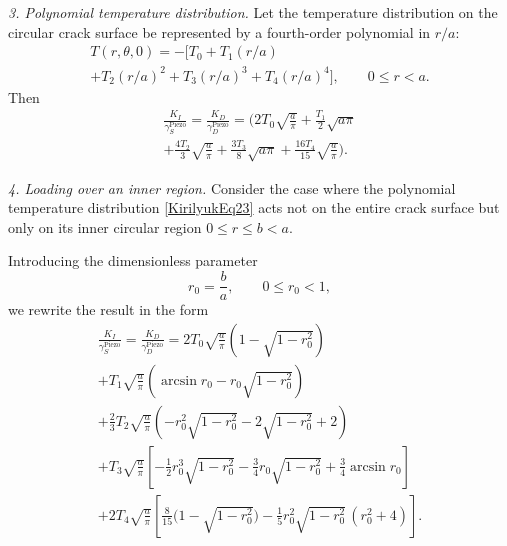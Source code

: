 \medskip
\emph{3. Polynomial temperature distribution.} Let the temperature distribution on the circular crack surface be represented by a fourth-order polynomial in $r/a$:
\begin{multline}
	T(r,\theta,0)
	=
	-\big[
	T_0 + T_1(r/a) 
	\\
	+ T_2(r/a)^2 + T_3(r/a)^3 + T_4(r/a)^4
	\big],
	\qquad 0 \le r < a .
	\label{KirilyukEq23}
\end{multline}
Then
\begin{multline}
	\frac{K_I}{\gamma_S^{\text{Piezo}}}
	=
	\frac{K_D}{\gamma_D^{\text{Piezo}}}
	=
	\bigg(
	2T_0\sqrt{\frac{a}{\pi}}
	+\frac{T_1}{2}\sqrt{a\pi}
	\\
	+\frac{4T_2}{3}\sqrt{\frac{a}{\pi}}
	+\frac{3T_3}{8}\sqrt{a\pi}
	+\frac{16T_4}{15}\sqrt{\frac{a}{\pi}}
	\bigg).
	\label{KirilyukEq24}
\end{multline}

\medskip
\emph{4. Loading over an inner region.} Consider the case where the polynomial temperature distribution
\eqref{KirilyukEq23} acts not on the entire crack surface but only on its inner circular region
$0 \le r \le b < a$.

Introducing the dimensionless parameter
\[
r_0=\frac{b}{a}, \qquad 0\le r_0  <1,
\]
we rewrite the result in the form
\begin{multline}
	\frac{K_I}{\gamma_S^{\text{Piezo}}}
	=
	\frac{K_D}{\gamma_D^{\text{Piezo}}}
	=
	2T_0\sqrt{\frac{a}{\pi}}
	\left(1-\sqrt{1- r_0^2}\right)
	\\
	+T_1\sqrt{\frac{a}{\pi}}
	\left(
	\arcsin r_0
	- r_0\sqrt{1- r_0^2}
	\right)
	\\
	+\frac{2}{3}T_2\sqrt{\frac{a}{\pi}}
	\left(
	- r_0^2\sqrt{1- r_0^2}
	-2\sqrt{1- r_0^2}
	+2
	\right)
	\\
	+T_3\sqrt{\frac{a}{\pi}}
	\left[
	-\frac12  r_0^3\sqrt{1- r_0^2}
	-\frac34  r_0\sqrt{1- r_0^2}
	+\frac34 \arcsin r_0
	\right]
	\\
	+2T_4\sqrt{\frac{a}{\pi}}
	\left[
	\frac{8}{15}\bigl(1-\sqrt{1- r_0^2}\bigr)
	-\frac15  r_0^2\sqrt{1- r_0^2}\,( r_0^2+4)
	\right].
	\label{KirilyukEq25}
\end{multline}


